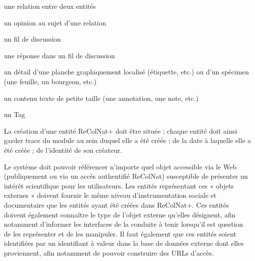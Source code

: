 \startsubsection[title={Entités contributives}]

\startitemize
	\item une relation entre deux entités
	\item un opinion au sujet d'une relation
	\item un fil de discussion
	\item une réponse dans un fil de discussion
	\item un détail d'une planche graphiquement localisé (étiquette, etc.) ou d'un spécimen (une feuille, un bourgeon, etc.)
	\item un contenu texte de petite taille (une annotation, une note, etc.)
	\item un Tag
\stopitemize

\startsection[title={Propriétés générales des entités}]

\exig{}
La création d'une entité ReColNat+ doit être située ; chaque entité doit ainsi garder trace du module au sein duquel elle a été créée ; de la date à laquelle elle a été créée ; de l'identité de son créateur.

\exig{}
Le système doit pouvoir référencer n'importe quel objet accessible via le Web (publiquement ou via un accès authentifié ReColNat) susceptible de présenter un intérêt scientifique pour les utilisateurs.
Les entités représentant ces « objets externes » doivent fournir le même niveau d'instrumentation sociale et documentaire que les entités ayant été créées dans ReColNat+.
Ces entités doivent également connaître le type de l'objet externe qu'elles désignent, afin notamment d'informer les interfaces de la conduite à tenir lorsqu'il est question de les représenter et de les manipuler.
Il faut également que ces entités soient identifiées par un identifiant à valeur dans la base de données externe dont elles proviennent, afin notamment de pouvoir construire des URLs d'accès.

